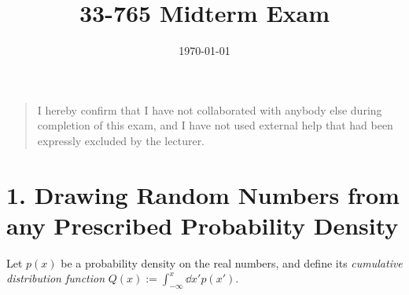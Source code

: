 \documentclass[a4paper,twoside]{article}
\title{33-765 Midterm Exam}
\date{\today}
\begin{document}
\maketitle
\begin{quote}
    I hereby confirm that I have not collaborated with anybody else during completion of this exam, and I have not used external help that had been expressly excluded by the lecturer.
\end{quote}

\section*{1. Drawing Random Numbers from any Prescribed Probability Density}
Let $ p(x) $ be a probability density on the real numbers, and define its \textit{cumulative distribution function} $ Q(x) := \int_{- \infty}^x \dd{x'} p(x') $.
\end{document}
